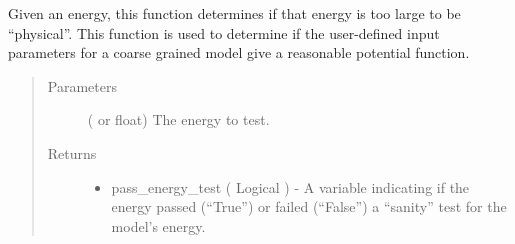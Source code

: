\documentclass[letterpaper,12pt,english,openany,oneside]{sphinxmanual}
\begin{document}

\begin{fulllineitems}
\label{\detokenize{ensembles:ensembles.ens_build.test_energy}}
Given an energy, this function determines if that energy is too large to be “physical”.  This function is used to determine if the user-defined input parameters for a coarse grained model give a reasonable potential function.
\begin{quote}\begin{description}
\item[{Parameters}] \leavevmode
{} ( or float) \textendash{} The energy to test.

\item[{Returns}] \leavevmode
\begin{itemize}
\item {} 
pass\_energy\_test ( Logical ) - A variable indicating if the energy passed (“True”) or failed (“False”) a “sanity” test for the model’s energy.

\end{itemize}


\end{description}\end{quote}

\end{fulllineitems}

\end{document}

